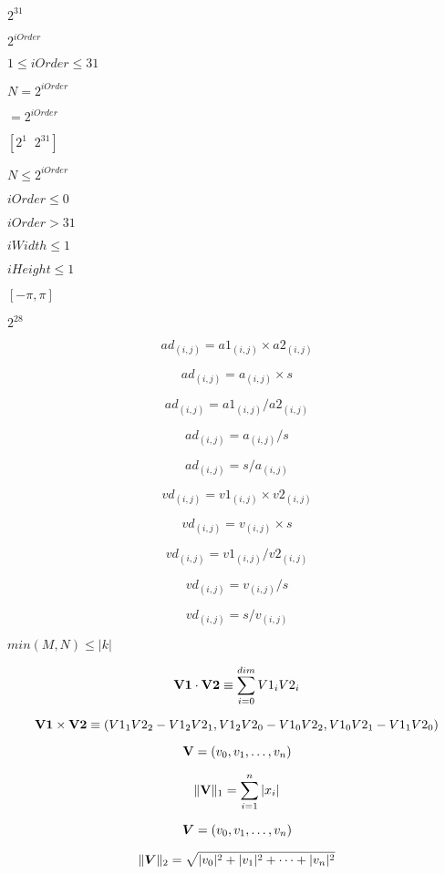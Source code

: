 \documentclass{article}
\begin{document}
$ 2^{31} $
\pagebreak

$ 2^{iOrder} $
\pagebreak

$ 1 \leq iOrder \leq 31 $
\pagebreak

$ N=2^{iOrder} $
\pagebreak

$ = 2^{iOrder} $
\pagebreak

$ [2^1\; \; 2^{31}] $
\pagebreak

$ N \leq 2^{iOrder} $
\pagebreak

$ iOrder \leq 0 $
\pagebreak

$ iOrder > 31 $
\pagebreak

$ iWidth \leq 1 $
\pagebreak

$ iHeight \leq 1 $
\pagebreak

$ [-\pi, \pi] $
\pagebreak

$2^{28} $
\pagebreak

\[ ad_{(i,j)} = a1_{(i,j)} \times a2_{(i,j)} \]
\pagebreak

\[ ad_{(i,j)} = a_{(i,j)} \times s \]
\pagebreak

\[ ad_{(i,j)} = a1_{(i,j)} / a2_{(i,j)} \]
\pagebreak

\[ ad_{(i,j)} = a_{(i,j)} / s \]
\pagebreak

\[ ad_{(i,j)} = s / a_{(i,j)} \]
\pagebreak

\[ vd_{(i,j)} = v1_{(i,j)} \times v2_{(i,j)} \]
\pagebreak

\[ vd_{(i,j)} = v_{(i,j)} \times s \]
\pagebreak

\[ vd_{(i,j)} = v1_{(i,j)} / v2_{(i,j)} \]
\pagebreak

\[ vd_{(i,j)} = v_{(i,j)} / s \]
\pagebreak

\[ vd_{(i,j)} = s / v_{(i,j)} \]
\pagebreak

$ min(M,N) \le |k| $
\pagebreak

\[ {\bf V1} \cdot {\bf V2} \equiv \sum_{i=0}^{dim} V1_i V2_i \]
\pagebreak

\[ {\bf V1} \times {\bf V2} \equiv \left( V1_1 V2_2 - V1_2 V2_1, V1_2 V2_0 - V1_0 V2_2, V1_0 V2_1 - V1_1 V2_0 \right) \]
\pagebreak

\[ {\bf V} = (v_0, v_1, \ldots , v_n) \]
\pagebreak

\[ \|{\bf V}\|_1 = \sum_{i=1}^{n}{|x_i|} \]
\pagebreak

\[ \mbox{\boldmath$V$} = (v_0, v_1, \ldots , v_n) \]
\pagebreak

\[ \|\mbox{\boldmath$V$}\|_2 = \sqrt{|v_0|^2 + |v_1|^2 + \cdots + |v_n|^2 } \]
\pagebreak
\end{document}
